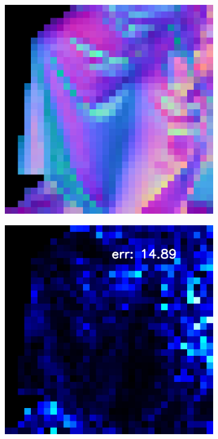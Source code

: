 \begin{figure}
\begin{subfigure}[b]{0.24\linewidth}
	\end{subfigure}
	\begin{subfigure}[b]{0.24\linewidth}
		\includegraphics[width=\linewidth]{./Figures/gcnn_synthetic/eval_3_normal_an2-8-1000.png}
	\end{subfigure}
	\begin{subfigure}[b]{0.24\linewidth}
		\includegraphics[width=\linewidth]{./Figures/gcnn_synthetic/eval_3_error_an2-8-1000.png}
	\end{subfigure}
	

\end{figure}
